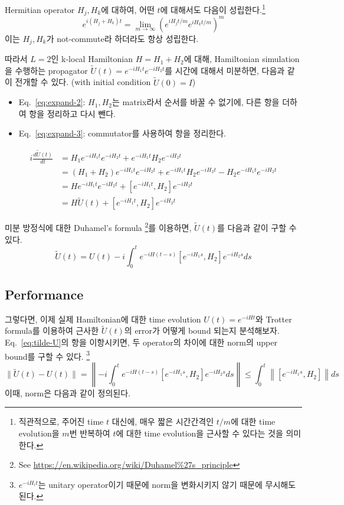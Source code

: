 \begin{theorem}\label{thm:trotter-formula}
  Hermitian operator $H_j, H_k$에 대하여, 어떤 $t$에 대해서도 다음이 성립한다.\footnote{직관적으로, 주어진 time $t$ 대신에, 매우 짧은 시간간격인 $t/m$에 대한 time evolution을 $m$번 반복하여 $t$에 대한 time evolution을 근사할 수 있다는 것을 의미한다.}
  $$ e^{i (H_j + H_k) t} = \lim_{m \to \infty} \left( e^{i H_j t/m} e^{i H_k t/m} \right)^m $$ 
  이는 $H_j, H_k$가 not-commute라 하더라도 항상 성립한다.
\end{theorem}

\vspace{1em} 

따라서 $L=2$인 k-local Hamiltonian $H = H_1 + H_2$에 대해, Hamiltonian simulation을 수행하는 propagator $\tilde U (t) = e^{-i H_1t} e^{-i H_2 t}$를 시간에 대해서 미분하면, 다음과 같이 전개할 수 있다.
(with initial condition $\tilde U(0) = I$)
\begin{itemize}
  \item Eq.~\eqref{eq:expand-2}: $H_1, H_2$는 matrix라서 순서를 바꿀 수 없기에, 다른 항을 더하여 항을 정리하고 다시 뺀다.
  \item Eq.~\eqref{eq:expand-3}: commutator를 사용하여 항을 정리한다.
\end{itemize}
\begin{align}
  i \frac{d \tilde{U}(t)}{d t} & =H_1 e^{-i H_1 t} e^{-i H_2 t}+e^{-i H_1 t} H_2 e^{-i H_2 t} \label{eq:expand-1} \\ 
  & =\left(H_1+H_2\right) e^{-i H_1 t} e^{-i H_2 t}+e^{-i H_1 t} H_2 e^{-i H_2 t}-H_2 e^{-i H_1 t} e^{-i H_2 t} \label{eq:expand-2} \\ 
  & = H e^{-i H_1 t} e^{-i H_2 t}+\left[e^{-i H_1 t}, H_2\right] e^{-i H_2 t} \label{eq:expand-3} \\ 
  & = H \tilde U(t)+\left[e^{-i H_1 t}, H_2\right] e^{-i H_2 t} \label{eq:expand-4}
\end{align}

미분 방정식에 대한 Duhamel's formula \footnote{See \url{https://en.wikipedia.org/wiki/Duhamel\%27s_principle}}를 이용하면, $\tilde U(t)$를 다음과 같이 구할 수 있다. 
\begin{equation}
  \tilde{U}(t)=U(t)-i \int_0^t e^{-i H(t-s)}\left[e^{-i H_1 s}, H_2\right] e^{-i H_2 s} ds \label{eq:tilde-U}
\end{equation}

\subsection{Performance}
그렇다면, 이제 실제 Hamiltonian에 대한 time evolution $U(t) = e^{-iHt}$와 Trotter formula를 이용하여 근사한 $\tilde U(t)$의 error가 어떻게 bound 되는지 분석해보자. Eq.~\eqref{eq:tilde-U}의 항을 이항시키면, 두 operator의 차이에 대한 norm의 upper bound를 구할 수 있다.
\footnote{$e^{-iH_it}$는 unitary operator이기 때문에 norm을 변화시키지 않기 때문에 무시해도 된다.}
\begin{equation}
  \|\tilde{U}(t)-U(t)\|  = \left\|-i \int_0^t e^{-i H(t-s)}\left[e^{-i H_1 s}, H_2\right] e^{-i H_2 s} d s \right\| \leq \int_0^t\left\|\left[e^{-i H_1 s}, H_2\right]\right\| ds \label{eq:distance}
\end{equation}
이때, norm은 다음과 같이 정의된다.

